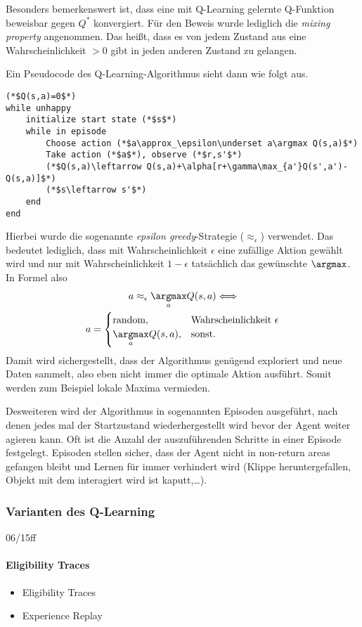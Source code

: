 \documentclass[ngerman]{../LaTeX-Templates/Paper/paper}
\begin{document}
Besonders bemerkenswert ist, dass eine mit Q-Learning gelernte Q-Funktion beweisbar gegen $Q^\ast$ konvergiert. Für den Beweis wurde lediglich die \emph{mixing property} angenommen. Das heißt, dass es von jedem Zustand aus eine Wahrscheinlichkeit $>0$ gibt in jeden anderen Zustand zu gelangen.

Ein Pseudocode des Q-Learning-Algorithmus sieht dann wie folgt aus.
\begin{lstlisting}
(*$Q(s,a)=0$*)
while unhappy
	initialize start state (*$s$*)
	while in episode
		Choose action (*$a\approx_\epsilon\underset a\argmax Q(s,a)$*)
		Take action (*$a$*), observe (*$r,s'$*)
		(*$Q(s,a)\leftarrow Q(s,a)+\alpha[r+\gamma\max_{a'}Q(s',a')-Q(s,a)]$*)
		(*$s\leftarrow s'$*)
	end
end\end{lstlisting}
Hierbei wurde die sogenannte \emph{epsilon greedy}-Strategie ($\approx_\epsilon$) verwendet. Das bedeutet lediglich, dass mit Wahrscheinlichkeit $\epsilon$ eine zufällige Aktion gewählt wird und nur mit Wahrscheinlichkeit $1-\epsilon$ tatsächlich das gewünschte $\argmax$. In Formel also
\begin{gather*}
	a\approx_\epsilon \underset a\argmax Q(s,a)\Longleftrightarrow\\ a=\begin{cases}
		\text{random},&\text{Wahrscheinlichkeit }\epsilon\\
		\underset a\argmax Q(s,a),&\text{sonst.}
	\end{cases}
\end{gather*}
Damit wird sichergestellt, dass der Algorithmus genügend exploriert und neue Daten sammelt, also eben nicht immer die optimale Aktion ausführt. Somit werden zum Beispiel lokale Maxima vermieden.

Desweiteren wird der Algorithmus in sogenannten Episoden ausgeführt, nach denen jedes mal der Startzustand wiederhergestellt wird bevor der Agent weiter agieren kann. Oft ist die Anzahl der auszuführenden Schritte in einer Episode festgelegt. Episoden stellen sicher, dass der Agent nicht in non-return areas gefangen bleibt und Lernen für immer verhindert wird (Klippe heruntergefallen, Objekt mit dem interagiert wird ist kaputt,\ldots).

\subsubsection{Varianten des Q-Learning}
06/15ff
\paragraph{Eligibility Traces}
\begin{itemize}
	\item Eligibility Traces
	\item Experience Replay
\end{itemize}
\end{document}
